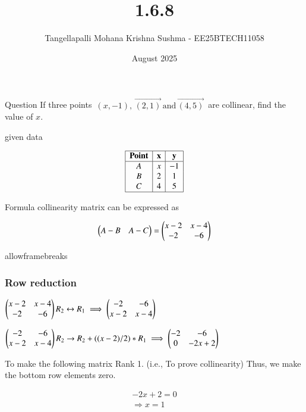 \documentclass{beamer}
\title %
{1.6.8}
\date{August  2025}
\author %
{Tangellapalli Mohana Krishna Sushma - EE25BTECH11058}
\begin{document}
\frame{\titlepage}
\begin{frame}{Question}
If three points $\,(x, -1),\, \vec{(2, 1)}\, \text{and} \, \vec{(4, 5)}\,$ are collinear, find the value of $x$.


\end{frame}
 
\begin{frame}{given data}

\[
\begin{array}{|c|c|c|}
\hline
\textbf{Point} & \textbf{x} & \textbf{y} \\
\hline
A & x & -1 \\
B & 2 & 1 \\
C & 4 & 5 \\
\hline
\end{array}
\] 

\end{frame}

\begin{frame}{Formula}
  collinearity matrix can be expressed as 

\begin{align*}
  \begin{myvec}{A-B & A-C\\}\end{myvec}=\begin{myvec}{x-2 & x-4\\-2 & -6\\}\end{myvec}
\end{align*}
\end{frame}

\begin{frame}{allowframebreaks}
\frametitle{Row reduction}

$\begin{pmatrix}x-2 & x-4\\-2 & -6\end{pmatrix}
R_2 \leftrightarrow R_1 \implies \begin{pmatrix} -2 & -6 \\ x-2 & x-4 \end{pmatrix}$

$\begin{pmatrix} -2 & -6 \\ x-2 & x-4 \end{pmatrix}
R_2 \rightarrow R_2 + ((x-2)/2)*R_1 \implies \begin{pmatrix} -2 & -6 \\ 0 & -2x+2 \end{pmatrix}$

To make the following matrix Rank 1. (i.e., To prove collinearity)
Thus, we make the bottom row elements zero.

\end{frame}


\begin{align*}
-2x + 2 = 0 \\
\Rightarrow x = 1 \\
\end{align*}
\end{document}
